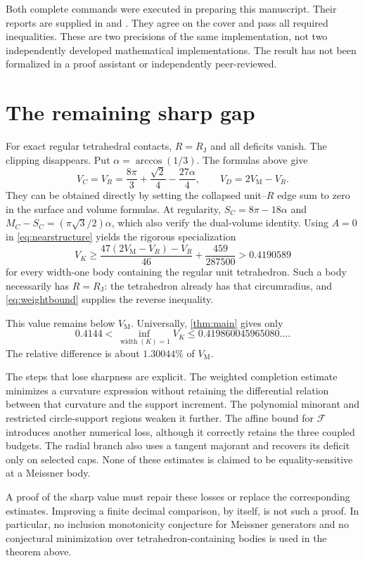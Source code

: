 \documentclass[11pt]{article}
\numberwithin{equation}{section}
\theoremstyle{definition}\newtheorem{definition}[theorem]{Definition}
\theoremstyle{remark}\newtheorem{remark}[theorem]{Remark}
\newcommand{\RJ}{R_{\mathrm J}}
\newcommand{\VM}{V_{\mathrm M}}
\begin{document}
Both complete commands were executed in preparing this manuscript. Their
reports are supplied in  and
. They agree on the cover and pass all required
inequalities. These are two precisions of the same implementation, not two
independently developed mathematical implementations. The result has not
been formalized in a proof assistant or independently peer-reviewed.

\section{The remaining sharp gap}\label{sec:remaining}
For exact regular tetrahedral contacts, $R=\RJ$ and all deficits vanish.
The clipping disappears. Put $\alpha=\arccos(1/3)$. The formulas above give
\[
 V_C=V_R=\frac{8\pi}{3}+\frac{\sqrt2}{4}-\frac{27\alpha}{4},
 \qquad V_D=2\VM-V_R.
\]
They can be obtained directly by setting the collapsed unit--$R$ edge sum
to zero in the surface and volume formulas. At regularity,
$S_C=8\pi-18\alpha$ and
$M_C-S_C=(\pi\sqrt3/2)\alpha$, which also verify the dual-volume identity.
Using $A=0$ in \cref{eq:nearstructure} yields the rigorous specialization
\begin{equation}\label{eq:regularbound}
 V_K\ge\frac{47(2\VM-V_R)-V_R}{46}+\frac{459}{287500}
 >0.4190589
\end{equation}
for every width-one body containing the regular unit tetrahedron. Such a
body necessarily has $R=\RJ$: the tetrahedron already has that circumradius,
and \cref{eq:weightbound} supplies the reverse inequality.

This value remains below $\VM$. Universally, \cref{thm:main} gives only
\[
 0.4144<\inf_{\operatorname{width}(K)=1}V_K
               \le0.419860045965080\ldots.
\]
The relative difference is about $1.30044\%$ of $\VM$.

The steps that lose sharpness are explicit. The weighted completion estimate
minimizes a curvature expression without retaining the differential relation
between that curvature and the support increment. The polynomial minorant
and restricted circle-support regions weaken it further. The affine bound
for $\mathcal F$ introduces another numerical loss, although it correctly
retains the three coupled budgets. The radial branch also uses a tangent
majorant and recovers its deficit only on selected caps. None of these
estimates is claimed to be equality-sensitive at a Meissner body.

A proof of the sharp value must repair these losses or replace the
corresponding estimates. Improving a finite decimal comparison, by itself,
is not such a proof. In particular, no inclusion monotonicity conjecture for
Meissner generators and no conjectural minimization over tetrahedron-containing
bodies is used in the theorem above.
\end{document}
